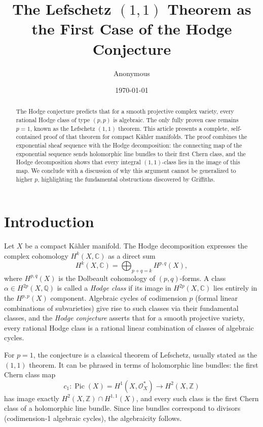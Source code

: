 \documentclass[12pt]{article}
\theoremstyle{plain}
\theoremstyle{definition}
\begin{document}
\title{The Lefschetz $(1,1)$ Theorem as the First Case of the Hodge Conjecture}
\date{\today}
\author{Anonymous}
\maketitle

\begin{abstract}
The Hodge conjecture predicts that for a smooth projective complex variety, every rational Hodge class of type $(p,p)$ is algebraic.
The only fully proven case remains $p=1$, known as the Lefschetz $(1,1)$ theorem.
This article presents a complete, self-contained proof of that theorem for compact K\"ahler manifolds.
The proof combines the exponential sheaf sequence with the Hodge decomposition:
the connecting map of the exponential sequence sends holomorphic line bundles to their first Chern class, and the Hodge decomposition shows that every integral $(1,1)$-class lies in the image of this map.
We conclude with a discussion of why this argument cannot be generalized to higher $p$, highlighting the fundamental obstructions discovered by Griffiths.
\end{abstract}

\section{Introduction}
Let $X$ be a compact K\"ahler manifold.
The Hodge decomposition expresses the complex cohomology $H^k(X,\mathbb C)$ as a direct sum
\[
H^k(X,\mathbb C) = \bigoplus_{p+q=k} H^{p,q}(X),
\]
where $H^{p,q}(X)$ is the Dolbeault cohomology of $(p,q)$-forms.
A class $\alpha \in H^{2p}(X,\mathbb Q)$ is called a \emph{Hodge class} if its image in $H^{2p}(X,\mathbb C)$ lies entirely in the $H^{p,p}(X)$ component.
Algebraic cycles of codimension $p$ (formal linear combinations of subvarieties) give rise to such classes via their fundamental classes, and the \emph{Hodge conjecture} asserts that for a smooth projective variety, every rational Hodge class is a rational linear combination of classes of algebraic cycles.

For $p=1$, the conjecture is a classical theorem of Lefschetz, usually stated as the $(1,1)$ theorem.
It can be phrased in terms of holomorphic line bundles: the first Chern class map
\[
c_1: \operatorname{Pic}(X) = H^1(X,\mathcal O_X^*) \longrightarrow H^2(X,\mathbb Z)
\]
has image exactly $H^2(X,\mathbb Z) \cap H^{1,1}(X)$, and every such class is the first Chern class of a holomorphic line bundle.
Since line bundles correspond to divisors (codimension‑1 algebraic cycles), the algebraicity follows.
\end{document}
